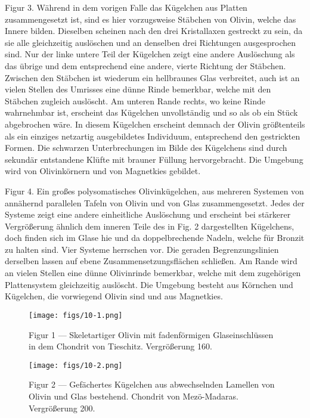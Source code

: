 \documentclass[a4paper, 12pt, oneside]{article}
\begin{document}
Figur 3. Während in dem vorigen Falle das Kügelchen aus Platten zusammengesetzt ist, sind es hier vorzugsweise Stäbchen von Olivin, welche das Innere bilden. Dieselben scheinen nach den drei Kristallaxen gestreckt zu sein, da sie alle gleichzeitig auslöschen und an denselben drei Richtungen ausgesprochen sind. Nur der linke untere Teil der Kügelchen zeigt eine andere Auslöschung als das übrige und dem entsprechend eine andere, vierte Richtung der Stäbchen. Zwischen den Stäbchen ist wiederum ein hellbraunes Glas verbreitet, auch ist an vielen Stellen des Umrisses eine dünne Rinde bemerkbar, welche mit den Stäbchen zugleich auslöscht. Am unteren Rande rechts, wo keine Rinde wahrnehmbar ist, erscheint das Kügelchen unvollständig und so als ob ein Stück abgebrochen wäre. In diesem Kügelchen erscheint demnach der Olivin größtenteils als ein einziges netzartig ausgebildetes Individuum, entsprechend den gestrickten Formen. Die schwarzen Unterbrechungen im Bilde des Kügelchens sind durch sekundär entstandene Klüfte mit brauner Füllung hervorgebracht. Die Umgebung wird von Olivinkörnern und von Magnetkies gebildet.

Figur 4. Ein großes polysomatisches Olivinkügelchen, aus mehreren Systemen von annähernd parallelen Tafeln von Olivin und von Glas zusammengesetzt. Jedes der Systeme zeigt eine andere einheitliche Auslöschung und erscheint bei stärkerer Vergrößerung ähnlich dem inneren Teile des in Fig. 2 dargestellten Kügelchens, doch finden sich im Glase hie und da doppelbrechende Nadeln, welche für Bronzit zu halten sind. Vier Systeme herrschen vor. Die geraden Begrenzungslinien derselben lassen auf ebene Zusammensetzungsflächen schließen. Am Rande wird an vielen Stellen eine dünne Olivinrinde bemerkbar, welche mit dem zugehörigen Plattensystem gleichzeitig auslöscht. Die Umgebung besteht aus Körnchen und Kügelchen, die vorwiegend Olivin sind und aus Magnetkies.
\clearpage

\vspace*{\fill}
\begin{figure}[H]
\centering
\texttt{[image: figs/10-1.png]}
\caption{\small Figur 1 --- Skeletartiger Olivin mit fadenförmigen Glaseinschlüssen in dem Chondrit von Tieschitz. Vergrößerung 160.}
\end{figure}
\vspace*{\fill}
\clearpage

\vspace*{\fill}
\begin{figure}[H]
\centering
\texttt{[image: figs/10-2.png]}
\caption{\small Figur 2 --- Gefächertes Kügelchen aus abwechselnden Lamellen von Olivin und Glas bestehend. Chondrit von Mezö-Madaras. Vergrößerung 200.}
\end{figure}
\vspace*{\fill}
\clearpage
\end{document}
